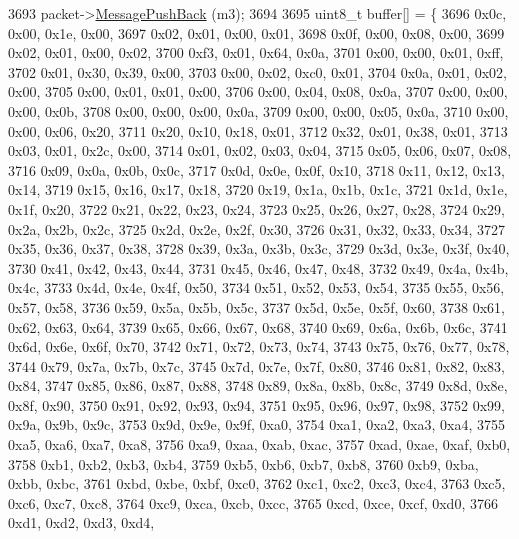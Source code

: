 \begin{DoxyCode}
3693     packet->\hyperlink{classns3_1_1PbbPacket_a4a3170001ef758d9c9c4375b8f089826}{MessagePushBack} (m3);
3694 
3695     uint8\_t buffer[] = \{
3696       0x0c, 0x00, 0x1e, 0x00,
3697       0x02, 0x01, 0x00, 0x01,
3698       0x0f, 0x00, 0x08, 0x00,
3699       0x02, 0x01, 0x00, 0x02,
3700       0xf3, 0x01, 0x64, 0x0a,
3701       0x00, 0x00, 0x01, 0xff,
3702       0x01, 0x30, 0x39, 0x00,
3703       0x00, 0x02, 0xc0, 0x01,
3704       0x0a, 0x01, 0x02, 0x00,
3705       0x00, 0x01, 0x01, 0x00,
3706       0x00, 0x04, 0x08, 0x0a,
3707       0x00, 0x00, 0x00, 0x0b,
3708       0x00, 0x00, 0x00, 0x0a,
3709       0x00, 0x00, 0x05, 0x0a,
3710       0x00, 0x00, 0x06, 0x20,
3711       0x20, 0x10, 0x18, 0x01,
3712       0x32, 0x01, 0x38, 0x01,
3713       0x03, 0x01, 0x2c, 0x00,
3714       0x01, 0x02, 0x03, 0x04,
3715       0x05, 0x06, 0x07, 0x08,
3716       0x09, 0x0a, 0x0b, 0x0c,
3717       0x0d, 0x0e, 0x0f, 0x10,
3718       0x11, 0x12, 0x13, 0x14,
3719       0x15, 0x16, 0x17, 0x18,
3720       0x19, 0x1a, 0x1b, 0x1c,
3721       0x1d, 0x1e, 0x1f, 0x20,
3722       0x21, 0x22, 0x23, 0x24,
3723       0x25, 0x26, 0x27, 0x28,
3724       0x29, 0x2a, 0x2b, 0x2c,
3725       0x2d, 0x2e, 0x2f, 0x30,
3726       0x31, 0x32, 0x33, 0x34,
3727       0x35, 0x36, 0x37, 0x38,
3728       0x39, 0x3a, 0x3b, 0x3c,
3729       0x3d, 0x3e, 0x3f, 0x40,
3730       0x41, 0x42, 0x43, 0x44,
3731       0x45, 0x46, 0x47, 0x48,
3732       0x49, 0x4a, 0x4b, 0x4c,
3733       0x4d, 0x4e, 0x4f, 0x50,
3734       0x51, 0x52, 0x53, 0x54,
3735       0x55, 0x56, 0x57, 0x58,
3736       0x59, 0x5a, 0x5b, 0x5c,
3737       0x5d, 0x5e, 0x5f, 0x60,
3738       0x61, 0x62, 0x63, 0x64,
3739       0x65, 0x66, 0x67, 0x68,
3740       0x69, 0x6a, 0x6b, 0x6c,
3741       0x6d, 0x6e, 0x6f, 0x70,
3742       0x71, 0x72, 0x73, 0x74,
3743       0x75, 0x76, 0x77, 0x78,
3744       0x79, 0x7a, 0x7b, 0x7c,
3745       0x7d, 0x7e, 0x7f, 0x80,
3746       0x81, 0x82, 0x83, 0x84,
3747       0x85, 0x86, 0x87, 0x88,
3748       0x89, 0x8a, 0x8b, 0x8c,
3749       0x8d, 0x8e, 0x8f, 0x90,
3750       0x91, 0x92, 0x93, 0x94,
3751       0x95, 0x96, 0x97, 0x98,
3752       0x99, 0x9a, 0x9b, 0x9c,
3753       0x9d, 0x9e, 0x9f, 0xa0,
3754       0xa1, 0xa2, 0xa3, 0xa4,
3755       0xa5, 0xa6, 0xa7, 0xa8,
3756       0xa9, 0xaa, 0xab, 0xac,
3757       0xad, 0xae, 0xaf, 0xb0,
3758       0xb1, 0xb2, 0xb3, 0xb4,
3759       0xb5, 0xb6, 0xb7, 0xb8,
3760       0xb9, 0xba, 0xbb, 0xbc,
3761       0xbd, 0xbe, 0xbf, 0xc0,
3762       0xc1, 0xc2, 0xc3, 0xc4,
3763       0xc5, 0xc6, 0xc7, 0xc8,
3764       0xc9, 0xca, 0xcb, 0xcc,
3765       0xcd, 0xce, 0xcf, 0xd0,
3766       0xd1, 0xd2, 0xd3, 0xd4,

\end{DoxyCode}
